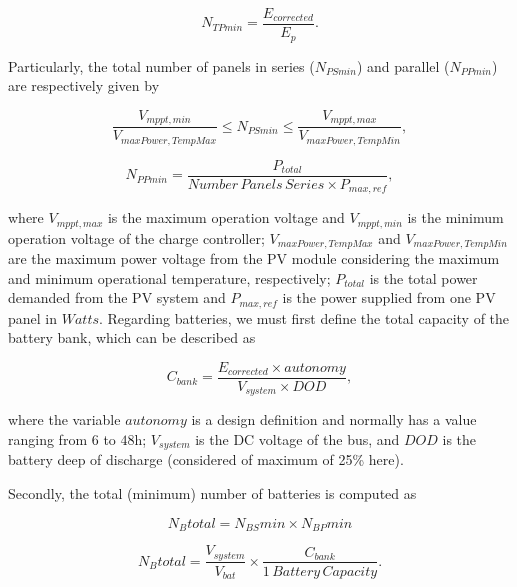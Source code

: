 \documentclass[journal]{IEEEtran}
\begin{document}
\begin{equation}
\label{eq:NTPmin}
N_{TPmin} = \dfrac{E_{corrected}}{E_{p}}.
\end{equation}

Particularly, the total number of panels in series ($N_{PSmin}$) and parallel ($N_{PPmin}$) are respectively given by

\begin{equation}
\label{eq:NPSmin}
\dfrac{V_{mppt,min}}{V_{maxPower,TempMax}} \leq N_{PSmin} \leq \dfrac{V_{mppt,max}}{V_{maxPower,TempMin}},
\end{equation}

\begin{equation}
\label{eq:NPPmin}
N_{PPmin} = \dfrac{P_{total}}{Number\,Panels\,Series \times P_{max,ref}},
\end{equation}

\noindent where $V_{mppt,max}$ is the maximum operation voltage and $V_{mppt,min}$ 
is the minimum operation voltage of the charge controller; $V_{maxPower,TempMax}$ and 
$V_{maxPower,TempMin}$ are the maximum power voltage from the PV module considering 
the maximum and minimum operational temperature, respectively; 
$P_{total}$ is the total power demanded from the PV system and 
$P_{max,ref}$ is the power supplied from one PV panel in $Watts$.
Regarding batteries, we must first define the total capacity of the battery bank, which can be described as

\begin{equation}
\label{eq:Cbank}
C_{bank} = \dfrac{E_{corrected} \times autonomy}{V_{system} \times DOD},
\end{equation}

\noindent where the variable $autonomy$ is a design definition and normally has a value ranging from $6$ to $48$h; 
$ V_{system} $ is the DC voltage of the bus, and $ DOD $ is the battery deep of discharge (considered of maximum of 25\% here).

Secondly, the total (minimum) number of batteries is computed as 

\begin{equation}
\label{eq:Nbtotal}
N_{B}total = N_{BS}min \times N_{BP}min
\end{equation}

\begin{equation}
\label{eq:Nbtotal2}
N_{B}total = \dfrac{V_{system}}{V_{bat}} \times \dfrac{C_{bank}}{1 \,Battery \, Capacity}.
\end{equation}
\end{document}
